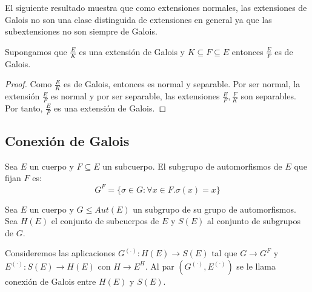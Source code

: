 El siguiente resultado muestra que como extensiones normales, las extensiones de Galois no son una clase distinguida de extensiones en general ya que las subextensiones no son siempre de Galois. 

\begin{proposition}
Supongamos que $\frac{E}{K}$ es una extensión de Galois y $K \subseteq F \subseteq E$ entonces $\frac{E}{F}$ es de Galois. 
\end{proposition}
\begin{proof}
Como $\frac{E}{K}$ es de Galois, entonces es normal y separable. Por ser normal, la extensión $\frac{E}{F}$ es normal y por ser separable, las extensiones $\frac{E}{F},\frac{F}{K}$ son separables. Por tanto, $\frac{E}{F}$ es una extensión de Galois. 
\end{proof}


\subsection{Conexión de Galois}

\begin{definition}
Sea $E$ un cuerpo y $F \subseteq E$ un subcuerpo. El subgrupo de automorfismos de $E$ que fijan $F$ es: $$G^F = \{\sigma \in G: \forall x \in F. \sigma(x) = x \}$$
\end{definition}

\begin{definition}
Sea $E$ un cuerpo y $G \le Aut(E)$ un subgrupo de su grupo de automorfismos. Sea $H(E)$ el conjunto de subcuerpos de $E$ y $S(E)$ al conjunto de subgrupos de $G$.

Consideremos las aplicaciones $G^{(\cdot)}:H(E) \to S(E)$ tal que $G \to G^{F}$ y $E^{(\cdot)}:S(E) \to H(E)$ con $H \to E^H$. Al par $(G^{(\cdot)},E^{(\cdot)})$ se le llama conexión de Galois entre $H(E)$ y $S(E)$. 
\end{definition}

